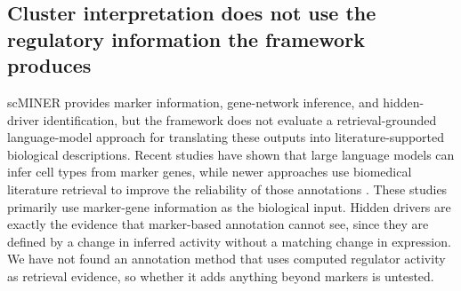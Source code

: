 \subsection{Cluster interpretation does not use the regulatory information the framework produces}
scMINER provides marker information, gene-network inference, and hidden-driver identification, but the framework does not evaluate a retrieval-grounded language-model approach for translating these outputs into literature-supported biological descriptions. Recent studies have shown that large language models can infer cell types from marker genes, while newer approaches use biomedical literature retrieval to improve the reliability of those annotations \cite{hou2024gpt4,crowley2025anndictionary,kazmi2025beyond,yang2026rag}. These studies primarily use marker-gene information as the biological input. Hidden drivers are exactly the evidence that marker-based annotation cannot see, since they are defined by a change in inferred activity without a matching change in expression. We have not found an annotation method that uses computed regulator activity as retrieval evidence, so whether it adds anything beyond markers is untested.
